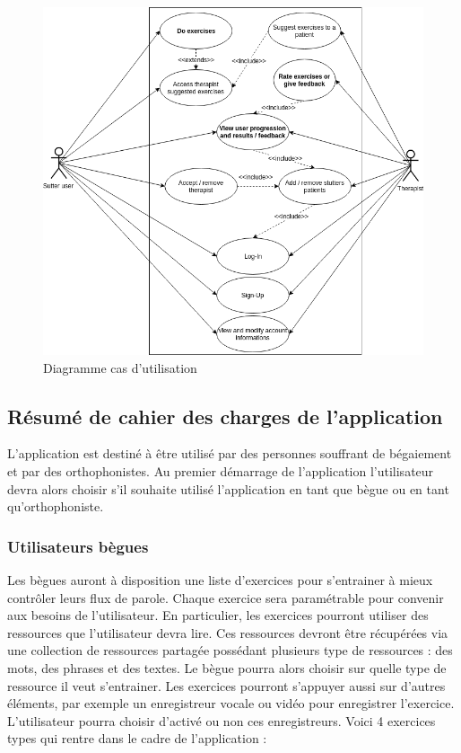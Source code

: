 \begin{figure}[h]
  \includegraphics[width=.9\linewidth]{content/imgs/usecase.png}
  \caption{Diagramme cas d'utilisation}
  \label{fig:srs}
\end{figure}

\subsection{Résumé de cahier des charges de l'application}
\label{sec:resume_cdc}

L'application est destiné à être utilisé par des personnes souffrant de bégaiement et par des orthophonistes. Au premier démarrage de l'application l'utilisateur devra alors choisir s'il souhaite utilisé l'application en tant que bègue ou en tant qu'orthophoniste.

\subsubsection{Utilisateurs bègues}

Les bègues auront à disposition une liste d'exercices pour s'entrainer à mieux contrôler leurs flux de parole. Chaque exercice sera paramétrable pour convenir aux besoins de l'utilisateur. En particulier, les exercices pourront utiliser des ressources que l'utilisateur devra lire. Ces ressources devront être récupérées via une collection de ressources partagée possédant plusieurs type de ressources : des mots, des phrases et des textes. Le bègue pourra alors choisir sur quelle type de ressource il veut s'entrainer. Les exercices pourront s'appuyer aussi sur d'autres éléments, par exemple un enregistreur vocale ou vidéo pour enregistrer l'exercice. L'utilisateur pourra choisir d'activé ou non ces enregistreurs. Voici 4 exercices types qui rentre dans le cadre de l'application :

